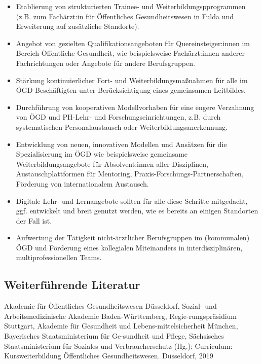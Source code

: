 \documentclass{article}
\begin{document}
\begin{itemize}
\item Etablierung von strukturierten Trainee- und Weiterbildungspprogrammen (z.B. zum Fachärzt:in für Öffentliches Gesundheitswesen in Fulda und Erweiterung auf zusätzliche Standorte).


\item Angebot von gezielten Qualifikationsangeboten für Quereinsteiger:innen im Bereich Öffentliche Gesundheit, wie beispielsweise Fachärzt:innen anderer Fachrichtungen oder Angebote für andere Berufsgruppen. 


\item Stärkung kontinuierlicher Fort- und Weiterbildungsmaßnahmen für alle im ÖGD Beschäftigten unter Berücksichtigung eines gemeinsamen Leitbildes.


\item Durchführung von kooperativen Modellvorhaben für eine engere Verzahnung von ÖGD und PH-Lehr- und Forschungseinrichtungen, z.B. durch systematischen Personalaustausch oder Weiterbildungsanerkennung.


\item Entwicklung von neuen, innovativen Modellen und Ansätzen für die Spezialisierung im ÖGD wie beispielsweise gemeinsame Weiterbildungsangebote für Absolvent:innen aller Disziplinen, Austauschplattformen für Mentoring, Praxis-Forschungs-Partnerschaften, Förderung von internationalem Austausch.


\item Digitale Lehr- und Lernangebote sollten für alle diese Schritte mitgedacht, ggf. entwickelt und breit genutzt werden, wie es bereits an einigen Standorten der Fall ist.


\item Aufwertung der Tätigkeit nicht-ärztlicher Berufsgruppen im (kommunalen) ÖGD und Förderung eines kollegialen Miteinanders in interdisziplinären, multiprofessionellen Teams.


\end{itemize}

\subsection{Weiterführende Literatur}\label{H9749657}



Akademie für Öffentliches Gesundheitswesen Düsseldorf, Sozial- und Arbeitsmedizinische Akademie Baden-Württemberg, Regie-rungspräsidium Stuttgart, Akademie für Gesundheit und Lebens-mittelsicherheit München, Bayerisches Staatsministerium für Ge-sundheit und Pflege, Sächsisches Staatsministerium für Soziales und Verbraucherschutz (Hg.): Curriculum: Kursweiterbildung Öffentliches Gesundheitswesen. Düsseldorf, 2019
\end{document}
